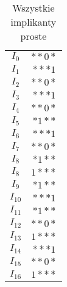\begin{table}[H]
    \centering
    \begin{tabular}[t]{ |c|c| }
        \hline
        $I_0$ & ${*}{*}0{*}$ \\
        $I_1$ & ${*}{*}{*}1$ \\
        \sout{$I_2$} & \sout{${*}{*}0{*}$} \\
        \sout{$I_3$} & \sout{${*}{*}{*}1$} \\
        \sout{$I_4$} & \sout{${*}{*}0{*}$}\\
        $I_5$ & ${*}1{*}{*}$ \\
        \sout{$I_6$} & \sout{${*}{*}{*}1$} \\
        \sout{$I_7$} & \sout{${*}{*}0{*}$} \\
        \sout{$I_8$} & \sout{${*}1{*}{*}$} \\
        $I_8$ & $1{*}{*}{*}$ \\
        \sout{$I_9$} & \sout{${*}1{*}{*}$} \\
        \sout{$I_{10}$} & \sout{${*}{*}{*}1$} \\
        \sout{$I_{11}$} &\sout{ ${*}1{*}{*}$} \\
        \sout{$I_{12}$} & \sout{${*}{*}0{*}$} \\
        \sout{ $I_{13}$} & \sout{$1{*}{*}{*}$} \\
        \sout{$I_{14}$} & \sout{${*}{*}{*}1$} \\
        \sout{$I_{15}$} & \sout{${*}{*}0{*}$} \\
        \sout{$I_{16}$} & \sout{$1{*}{*}{*}$} \\
        \hline
    \end{tabular}
    \caption{Wszystkie implikanty proste} \label{tab:all-implicants}
\end{table}

